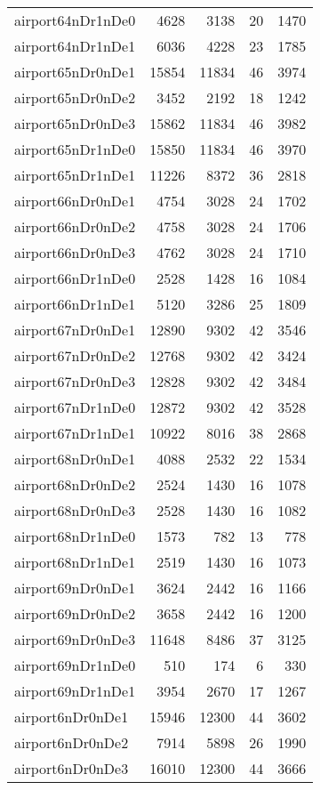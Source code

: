\begin{tabular}{lrrrr}
airport64nDr1nDe0 & 4628 & 3138 & 20 & 1470 \\
airport64nDr1nDe1 & 6036 & 4228 & 23 & 1785 \\
airport65nDr0nDe1 & 15854 & 11834 & 46 & 3974 \\
airport65nDr0nDe2 & 3452 & 2192 & 18 & 1242 \\
airport65nDr0nDe3 & 15862 & 11834 & 46 & 3982 \\
airport65nDr1nDe0 & 15850 & 11834 & 46 & 3970 \\
airport65nDr1nDe1 & 11226 & 8372 & 36 & 2818 \\
airport66nDr0nDe1 & 4754 & 3028 & 24 & 1702 \\
airport66nDr0nDe2 & 4758 & 3028 & 24 & 1706 \\
airport66nDr0nDe3 & 4762 & 3028 & 24 & 1710 \\
airport66nDr1nDe0 & 2528 & 1428 & 16 & 1084 \\
airport66nDr1nDe1 & 5120 & 3286 & 25 & 1809 \\
airport67nDr0nDe1 & 12890 & 9302 & 42 & 3546 \\
airport67nDr0nDe2 & 12768 & 9302 & 42 & 3424 \\
airport67nDr0nDe3 & 12828 & 9302 & 42 & 3484 \\
airport67nDr1nDe0 & 12872 & 9302 & 42 & 3528 \\
airport67nDr1nDe1 & 10922 & 8016 & 38 & 2868 \\
airport68nDr0nDe1 & 4088 & 2532 & 22 & 1534 \\
airport68nDr0nDe2 & 2524 & 1430 & 16 & 1078 \\
airport68nDr0nDe3 & 2528 & 1430 & 16 & 1082 \\
airport68nDr1nDe0 & 1573 & 782 & 13 & 778 \\
airport68nDr1nDe1 & 2519 & 1430 & 16 & 1073 \\
airport69nDr0nDe1 & 3624 & 2442 & 16 & 1166 \\
airport69nDr0nDe2 & 3658 & 2442 & 16 & 1200 \\
airport69nDr0nDe3 & 11648 & 8486 & 37 & 3125 \\
airport69nDr1nDe0 & 510 & 174 & 6 & 330 \\
airport69nDr1nDe1 & 3954 & 2670 & 17 & 1267 \\
airport6nDr0nDe1 & 15946 & 12300 & 44 & 3602 \\
airport6nDr0nDe2 & 7914 & 5898 & 26 & 1990 \\
airport6nDr0nDe3 & 16010 & 12300 & 44 & 3666 \\

\end{tabular}
